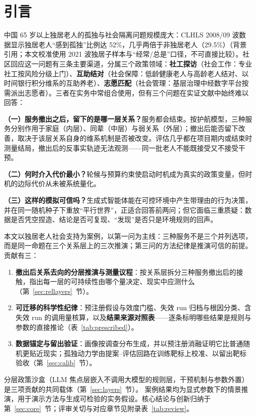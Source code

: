 \documentclass[10.5pt,twocolumn]{ctexart}
\begin{document}
\section{引言}
中国 65 岁以上独居老人的孤独与社会隔离问题规模庞大：CLHLS 2008/09 波数据显示独居老人``感到孤独''比例达 52\%，几乎两倍于非独居老人（29.5\%）\citep{wei2022living}（背景引用；本文校准使用 2021 波独居子样本与``经常/总是''口径，不可直接比较）。社区回应这一问题有三条主要渠道，分属三个政策领域：\textbf{社工探访}（社会工作：专业社工按风险分级上门）、\textbf{互助结对}（社会保障：低龄健康老人与高龄老人结对、以时间银行积分维系的互助养老）、\textbf{志愿匹配}（社会管理：基层治理中经数字平台按需派出志愿者）。三者在实务中常组合使用，但有三个问题在实证文献中始终难以回答：

\textbf{（一）服务撤出之后，留下的是哪一层关系？}服务都会结束。按护航模型\citep{kahn1980convoys}，三种服务分别作用于家庭（内层）、同辈（中层）与弱关系（外层）；撤出后能否留下改善，取决于该层关系自身的维系机制是否被改变。评估几乎都在项目期内或结束时测量结局\citep{lu2024timebank}，撤出后的反事实轨迹无法观测——同一批老人不能既接受又不接受干预。

\textbf{（二）何时介入代价最小？}轮候与预算约束使启动时机成为真实的政策变量，但时机的边际代价从未被系统量化。

\textbf{（三）这样的模拟可信吗？}生成式智能体\citep{park2023generative}能在可控环境中产生带理由的行为决策，并在同一随机种子下重放``平行世界''，正适合回答前两问；但它面临三重质疑：数据是否凭空捏造、结论是否可复现、``发现''是否只是环境规则的回声。

本文以独居老人社会支持为案例，以第一问为主线：三种服务不是三个并列选项，而是同一命题在三个关系层上的三次推演；第三问的方法纪律是推演可信的前提。贡献有三：

\begin{enumerate}
  \item \textbf{撤出后关系去向的分层推演与测量议程}：按关系层拆分三种服务撤出后的接触，指出每一层的可持续性由哪个量决定、现实中应测什么（第~\ref{sec:rellayers}~节）。
  \item \textbf{可迁移的科学性纪律}：预注册假设与效度门槛、失效 run 归档与根因分类、含失效 run 的调用量核算，以及\textbf{结果来源对照表}——逐条标明哪些结果是规则与参数的直接推论（表~\ref{tab:prescribed}）。
  \item \textbf{数据锚定与留出验证}：画像按调查分布生成，并以预注册消融证明它比普通随机更贴近现实；孤独动力学由提案--评估回路在训练靶标上校准、以留出靶标验收（第~\ref{sec:calib}~节）。
\end{enumerate}
分层政策沙盒（LLM 焦点层嵌入不调用大模型的规则层，干预机制与参数外置）是三项贡献的共同载体（第~\ref{sec:layers}~节）。
案例结果均为显式参数下的情景推演，用于演示方法与生成可检验的实务假设。核心结论与创新归纳于第~\ref{sec:core}~节；评审关切与对应章节见附录表~\ref{tab:review}。
\end{document}
